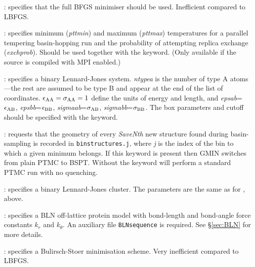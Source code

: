 : specifies that the full BFGS minimiser should be used. Inefficient compared to LBFGS.

: specifies minimum ({\it pttmin\/}) and maximum 
({\it pttmax\/}) temperatures
for a parallel tempering basin-hopping run and the probability of attempting replica
exchange ({\it exchprob\/}). Should be used together with the {\/} keyword.
(Only available if the source is compiled with MPI enabled.)  

: specifies a binary Lennard-Jones
system. {\it ntypea\/} is the number of type
A atoms---the rest are assumed to be type B and appear at the end of the list
of coordinates. $\epsilon_{\rm AA}=\sigma_{\rm AA}=1$ define the units of energy and length,
and {\it epsab\/}=$\epsilon_{\rm AB}$, {\it epsbb\/}=$\epsilon_{\rm BB}$,
{\it sigmaab\/}=$\sigma_{\rm AB}$, {\it sigmabb\/}=$\sigma_{\rm BB}$.
The box parameters and cutoff should be specified with the {\/} keyword.

: requests that the geometry of every {\it SaveNth} 
new structure found during basin-sampling is
recorded in {\tt binstructures.j}, where {\it j} is the index of the bin
to which a given minimum belongs. If this keyword is
present then GMIN switches from plain PTMC to BSPT.  
Without {} the {} keyword will perform a
standard PTMC run with no quenching. 

: specifies a binary Lennard-Jones
cluster. The parameters are the same as for {\/}, above.

: specifies a BLN off-lattice protein model with
bond-length and bond-angle force constants $k_r$ and $k_\theta$.
An auxiliary file {\tt BLNsequence} is required.
See \S \ref{sec:BLN} for more details.

: specifies a Bulirsch-Stoer minimisation scheme. 
Very inefficient compared to LBFGS.

